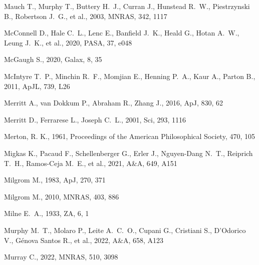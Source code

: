 \documentclass[fleqn,12pt]{article}
\begin{document}
\begin{thebibliography}{}
 Mauch T., Murphy T., Buttery H.~J., Curran J., Hunstead R.~W., Piestrzynski B., Robertson J.~G., et al., 2003, MNRAS, 342, 1117

 McConnell D., Hale C.~L., Lenc E., Banfield J.~K., Heald G., Hotan A.~W., Leung J.~K., et al., 2020, PASA, 37, e048

 McGaugh S., 2020, Galax, 8, 35

 McIntyre T.~P., Minchin R.~F., Momjian E., Henning P.~A., Kaur A., Parton B., 2011, ApJL, 739, L26

 Merritt A., van Dokkum P., Abraham R., Zhang J., 2016, ApJ, 830, 62

 Merritt D., Ferrarese L., Joseph C.~L., 2001, Sci, 293, 1116

 Merton, R. K., 1961, Proceedings of the American Philosophical Society, 470, 105

 Migkas K., Pacaud F., Schellenberger G., Erler J., Nguyen-Dang N.~T., Reiprich T.~H., Ramos-Ceja M.~E., et al., 2021, A\&A, 649, A151

 Milgrom M., 1983, ApJ, 270, 371

 Milgrom M., 2010, MNRAS, 403, 886

 Milne E.~A., 1933, ZA, 6, 1


 Murphy M.~T., Molaro P., Leite A.~C.~O., Cupani G., Cristiani S., D'Odorico V., G{\'e}nova Santos R., et al., 2022, A\&A, 658, A123

 Murray C., 2022, MNRAS, 510, 3098


\end{thebibliography}
\end{document}
